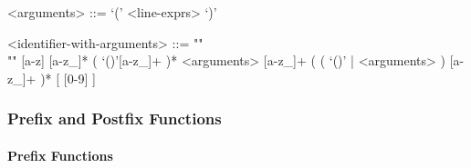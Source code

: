 \documentclass{article}
\begin{document}
\begin{itemize}
\begin{grammar}
<arguments> ::= `(' <line-exprs> `)'

<identifier-with-arguments> ::= ""\\""
[a-z] [a-z_]* ( `()'[a-z_]+ )* <arguments>
[a-z_]+ ( ( `()' | <arguments> ) [a-z_]+ )* 
[ [0-9] ]
\end{grammar}

\end{itemize}

\subsubsection{Prefix and Postfix Functions}
 
\paragraph{Prefix Functions}
\end{document}
